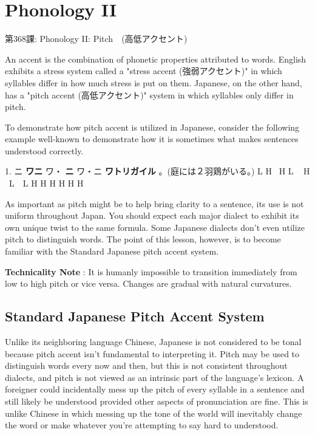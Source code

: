     
\chapter{Phonology II}

\begin{center}
\begin{Large}
第368課: Phonology II: Pitch　(高低アクセント) 
\end{Large}
\end{center}
 
\par{ An accent is the combination of phonetic properties attributed to words. English exhibits a stress system called a "stress accent (強弱アクセント)" in which syllables differ in how much stress is put on them. Japanese, on the other hand, has a "pitch accent (高低アクセント)" system in which syllables only differ in pitch. }

\par{ To demonstrate how pitch accent is utilized in Japanese, consider the following example well-known to demonstrate how it is sometimes what makes sentences understood correctly. }

\par{1. ニ \textbf{ワニ }ワ・ \textbf{ニ }ワ・ニ \textbf{ワトリガイル }。(庭には２羽鶏がいる。) \hfill\break
L H  H L   H  L　L H H H H H H }

\par{ As important as pitch might be to help bring clarity to a sentence, its use is not uniform throughout Japan. You should expect each major dialect to exhibit its own unique twist to the same formula. Some Japanese dialects don't even utilize pitch to distinguish words. The point of this lesson, however, is to become familiar with the Standard Japanese pitch accent system. }

\par{\textbf{Technicality Note }: It is humanly impossible to transition immediately from low to high pitch or vice versa. Changes are gradual with natural curvatures. }
      
\section{Standard Japanese Pitch Accent System}
 
\par{ Unlike its neighboring language Chinese, Japanese is not considered to be tonal because pitch accent isn't fundamental to interpreting it. Pitch may be used to distinguish words every now and then, but this is not consistent throughout dialects, and pitch is not viewed as an intrinsic part of the language's lexicon. A foreigner could incidentally mess up the pitch of every syllable in a sentence and still likely be understood provided other aspects of pronunciation are fine. This is unlike Chinese in which messing up the tone of the world will inevitably change the word or make whatever you're attempting to say hard to understood. }

